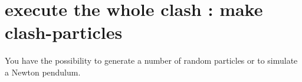 \hypertarget{index_To}{}\section{execute the whole clash \-: make clash-\/particles}\label{index_To}
You have the possibility to generate a number of random particles or to simulate a Newton pendulum. 